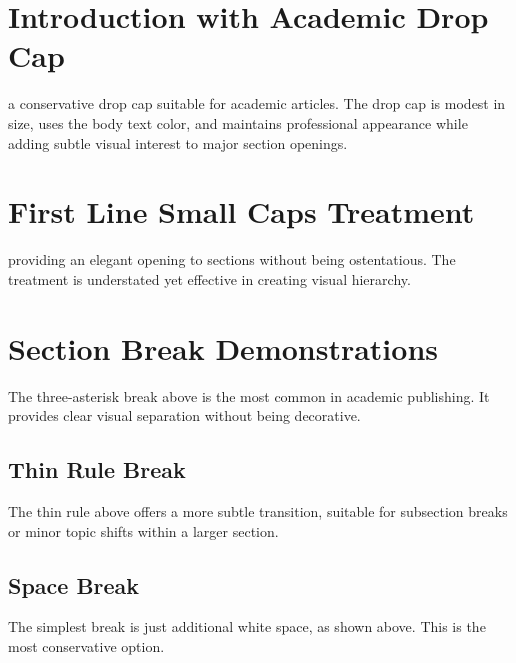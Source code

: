 \documentclass[11pt]{article}
\begin{document}
\section{Introduction with Academic Drop Cap}

 a conservative drop cap suitable for academic articles. The drop cap is modest in size, uses the body text color, and maintains professional appearance while adding subtle visual interest to major section openings.

\lipsum[1]

\section{First Line Small Caps Treatment}

 providing an elegant opening to sections without being ostentatious. The treatment is understated yet effective in creating visual hierarchy.

\lipsum[2]

\sectionbreak

\section{Section Break Demonstrations}

The three-asterisk break above is the most common in academic publishing. It provides clear visual separation without being decorative.

\lipsum[3]

\thinrulebreak

\subsection{Thin Rule Break}

The thin rule above offers a more subtle transition, suitable for subsection breaks or minor topic shifts within a larger section.

\lipsum[4]

\spacebreak

\subsection{Space Break}

The simplest break is just additional white space, as shown above. This is the most conservative option.
\end{document}

